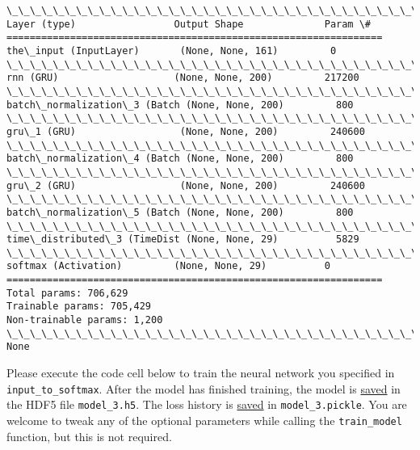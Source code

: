 \documentclass[11pt]{article}
\begin{document}
    \begin{Verbatim}[commandchars=\\\{\}]
\_\_\_\_\_\_\_\_\_\_\_\_\_\_\_\_\_\_\_\_\_\_\_\_\_\_\_\_\_\_\_\_\_\_\_\_\_\_\_\_\_\_\_\_\_\_\_\_\_\_\_\_\_\_\_\_\_\_\_\_\_\_\_\_\_
Layer (type)                 Output Shape              Param \#   
=================================================================
the\_input (InputLayer)       (None, None, 161)         0         
\_\_\_\_\_\_\_\_\_\_\_\_\_\_\_\_\_\_\_\_\_\_\_\_\_\_\_\_\_\_\_\_\_\_\_\_\_\_\_\_\_\_\_\_\_\_\_\_\_\_\_\_\_\_\_\_\_\_\_\_\_\_\_\_\_
rnn (GRU)                    (None, None, 200)         217200    
\_\_\_\_\_\_\_\_\_\_\_\_\_\_\_\_\_\_\_\_\_\_\_\_\_\_\_\_\_\_\_\_\_\_\_\_\_\_\_\_\_\_\_\_\_\_\_\_\_\_\_\_\_\_\_\_\_\_\_\_\_\_\_\_\_
batch\_normalization\_3 (Batch (None, None, 200)         800       
\_\_\_\_\_\_\_\_\_\_\_\_\_\_\_\_\_\_\_\_\_\_\_\_\_\_\_\_\_\_\_\_\_\_\_\_\_\_\_\_\_\_\_\_\_\_\_\_\_\_\_\_\_\_\_\_\_\_\_\_\_\_\_\_\_
gru\_1 (GRU)                  (None, None, 200)         240600    
\_\_\_\_\_\_\_\_\_\_\_\_\_\_\_\_\_\_\_\_\_\_\_\_\_\_\_\_\_\_\_\_\_\_\_\_\_\_\_\_\_\_\_\_\_\_\_\_\_\_\_\_\_\_\_\_\_\_\_\_\_\_\_\_\_
batch\_normalization\_4 (Batch (None, None, 200)         800       
\_\_\_\_\_\_\_\_\_\_\_\_\_\_\_\_\_\_\_\_\_\_\_\_\_\_\_\_\_\_\_\_\_\_\_\_\_\_\_\_\_\_\_\_\_\_\_\_\_\_\_\_\_\_\_\_\_\_\_\_\_\_\_\_\_
gru\_2 (GRU)                  (None, None, 200)         240600    
\_\_\_\_\_\_\_\_\_\_\_\_\_\_\_\_\_\_\_\_\_\_\_\_\_\_\_\_\_\_\_\_\_\_\_\_\_\_\_\_\_\_\_\_\_\_\_\_\_\_\_\_\_\_\_\_\_\_\_\_\_\_\_\_\_
batch\_normalization\_5 (Batch (None, None, 200)         800       
\_\_\_\_\_\_\_\_\_\_\_\_\_\_\_\_\_\_\_\_\_\_\_\_\_\_\_\_\_\_\_\_\_\_\_\_\_\_\_\_\_\_\_\_\_\_\_\_\_\_\_\_\_\_\_\_\_\_\_\_\_\_\_\_\_
time\_distributed\_3 (TimeDist (None, None, 29)          5829      
\_\_\_\_\_\_\_\_\_\_\_\_\_\_\_\_\_\_\_\_\_\_\_\_\_\_\_\_\_\_\_\_\_\_\_\_\_\_\_\_\_\_\_\_\_\_\_\_\_\_\_\_\_\_\_\_\_\_\_\_\_\_\_\_\_
softmax (Activation)         (None, None, 29)          0         
=================================================================
Total params: 706,629
Trainable params: 705,429
Non-trainable params: 1,200
\_\_\_\_\_\_\_\_\_\_\_\_\_\_\_\_\_\_\_\_\_\_\_\_\_\_\_\_\_\_\_\_\_\_\_\_\_\_\_\_\_\_\_\_\_\_\_\_\_\_\_\_\_\_\_\_\_\_\_\_\_\_\_\_\_
None

    \end{Verbatim}

    Please execute the code cell below to train the neural network you
specified in \texttt{input\_to\_softmax}. After the model has finished
training, the model is
\href{https://keras.io/getting-started/faq/\#how-can-i-save-a-keras-model}{saved}
in the HDF5 file \texttt{model\_3.h5}. The loss history is
\href{https://wiki.python.org/moin/UsingPickle}{saved} in
\texttt{model\_3.pickle}. You are welcome to tweak any of the optional
parameters while calling the \texttt{train\_model} function, but this is
not required.
\end{document}
